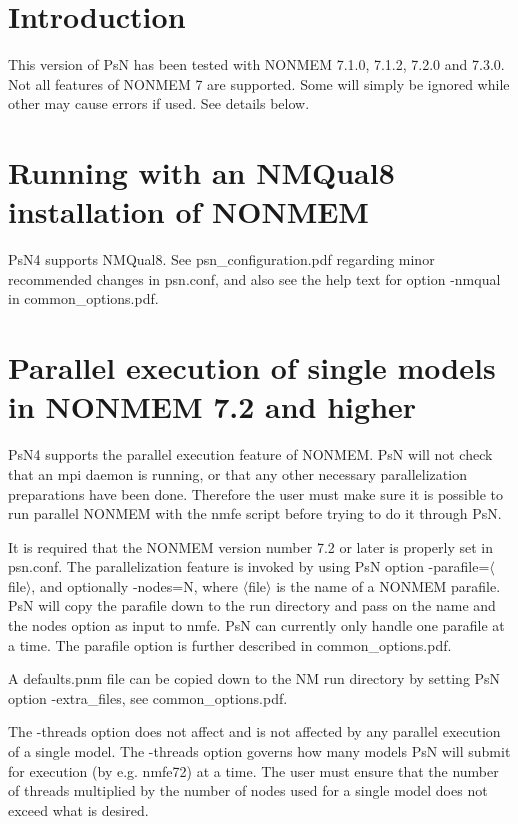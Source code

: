 



\maketitle


\section{Introduction}
This version of PsN has been tested with NONMEM 7.1.0, 7.1.2, 7.2.0 and 7.3.0. Not all features of NONMEM 7 are supported. Some will simply be ignored while other may cause errors if used. See details below.

\section{Running with an NMQual8 installation of NONMEM}
PsN4 supports NMQual8. See psn\_configuration.pdf regarding minor recommended changes in psn.conf, and also see
the help text for option -nmqual in common\_options.pdf.

\section{Parallel execution of single models in NONMEM 7.2 and higher}
PsN4 supports the parallel execution feature of NONMEM. PsN will not check that an mpi daemon is running, or that any other necessary parallelization preparations have been done. Therefore the user must make sure it is possible to run parallel NONMEM with the nmfe script before trying to do it through PsN.

It is required that the NONMEM version number 7.2 or later is properly set in psn.conf. 
The parallelization feature is invoked by using PsN option -parafile=$\langle$file$\rangle$, and optionally -nodes=N, where $\langle$file$\rangle$ is the name of a NONMEM parafile. PsN will copy the parafile down to the run directory and pass on the name and the nodes option as input to nmfe. PsN can currently only handle one parafile at a time. The parafile option is further described in common\_options.pdf.

A defaults.pnm file can be copied down to the NM run directory by setting PsN option -extra\_files, see common\_options.pdf.

The -threads option does not affect and is not affected by any parallel execution of a single model. The -threads option governs how many models PsN will submit for execution (by e.g. nmfe72) at a time. The user must ensure that the number of threads multiplied by the number of nodes used for a single model does not exceed what is desired. 


